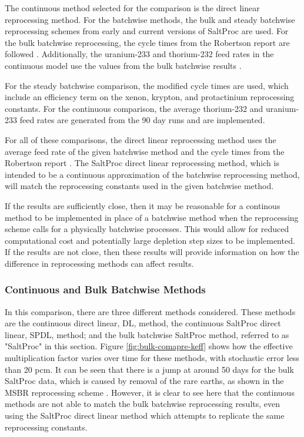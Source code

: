 The continuous method selected for the comparison is the direct linear reprocessing method. For the batchwise methods, the bulk and steady batchwise reprocessing schemes from early and current versions of SaltProc are used. For the bulk batchwise reprocessing, the cycle times from the Robertson report are followed \cite{robertson_conceptual_1971}. Additionally, the uranium-233 and thorium-232 feed rates in the continuous model use the values from the bulk batchwise results \cite{rykhlevskii_advanced_2018}.

For the steady batchwise comparison, the modified cycle times are used, which include an efficiency term on the xenon, krypton, and protactinium reprocessing constants. For the continuous comparison, the average thorium-232 and uranium-233 feed rates are generated from the 90 day runs and are implemented.

For all of these comparisons, the direct linear reprocessing method uses the average feed rate of the given batchwise method and the cycle times from the Robertson report \cite{robertson_conceptual_1971}. The SaltProc direct linear reprocessing method, which is intended to be a continuous approximation of the batchwise reprocessing method, will match the reprocessing constants used in the given batchwise method.

If the results are sufficiently close, then it may be reasonable for a continous method to be implemented in place of a batchwise method when the reprocessing scheme calls for a physically batchwise processes. This would allow for reduced computational cost and potentially large depletion step sizes to be implemented. If the results are not close, then these results will provide information on how the difference in reprocessing methods can affect results.


\subsubsection{Continuous and Bulk Batchwise Methods}
\label{s:bulk}

In this comparison, there are three different methods considered. These methods are the continuous direct linear, DL, method, the continuous SaltProc direct linear, SPDL, method; and the bulk batchwise SaltProc method, referred to as "SaltProc" in this section. Figure \ref{fig:bulk-comapre-keff} shows how the effective multiplication factor varies over time for these methods, with stochastic error less than 20 pcm.
It can be seen that there is a jump at around 50 days for the bulk SaltProc data, which is caused by removal of the rare earths, as shown in the MSBR reprocessing scheme \cite{robertson_conceptual_1971}. However, it is clear to see here that the continuous methods are not able to match the bulk batchwise reprocessing results, even using the SaltProc direct linear method which attempts to replicate the same reprocessing constants.

